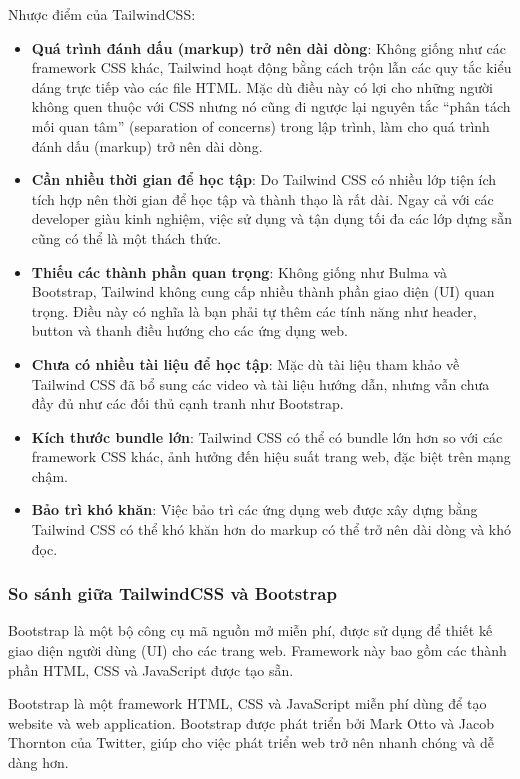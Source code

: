 Nhược điểm của TailwindCSS:
\begin{itemize}
    \item \textbf{Quá trình đánh dấu (markup) trở nên dài dòng}: Không giống như các framework CSS khác, Tailwind hoạt động bằng cách trộn lẫn các quy tắc kiểu dáng trực tiếp vào các file HTML. Mặc dù điều này có lợi cho những người không quen thuộc với CSS nhưng nó cũng đi ngược lại nguyên tắc “phân tách mối quan tâm” (separation of concerns) trong lập trình, làm cho quá trình đánh dấu (markup) trở nên dài dòng. 
    \item \textbf{Cần nhiều thời gian để học tập}: Do Tailwind CSS có nhiều lớp tiện ích tích hợp nên thời gian để học tập và thành thạo là rất dài. Ngay cả với các developer giàu kinh nghiệm, việc sử dụng và tận dụng tối đa các lớp dựng sẵn cũng có thể là một thách thức. 
    \item \textbf{Thiếu các thành phần quan trọng}: Không giống như Bulma và Bootstrap, Tailwind không cung cấp nhiều thành phần giao diện (UI) quan trọng. Điều này có nghĩa là bạn phải tự thêm các tính năng như header, button và thanh điều hướng cho các ứng dụng web. 
    \item \textbf{Chưa có nhiều tài liệu để học tập}: Mặc dù tài liệu tham khảo về Tailwind CSS đã bổ sung các video và tài liệu hướng dẫn, nhưng vẫn chưa đầy đủ như các đối thủ cạnh tranh như Bootstrap. 
    \item \textbf{Kích thước bundle lớn}: Tailwind CSS có thể có bundle lớn hơn so với các framework CSS khác, ảnh hưởng đến hiệu suất trang web, đặc biệt trên mạng chậm. 
    \item \textbf{Bảo trì khó khăn}: Việc bảo trì các ứng dụng web được xây dựng bằng Tailwind CSS có thể khó khăn hơn do markup có thể trở nên dài dòng và khó đọc. \\
\end{itemize}

\subsubsection{So sánh giữa TailwindCSS và Bootstrap}
Bootstrap là một bộ công cụ mã nguồn mở miễn phí, được sử dụng để thiết kế giao diện người dùng (UI) cho các trang web. Framework này bao gồm các thành phần HTML, CSS và JavaScript được tạo sẵn. 

Bootstrap là một framework HTML, CSS và JavaScript miễn phí dùng để tạo website và web application. Bootstrap được phát triển bởi Mark Otto và Jacob Thornton của Twitter, giúp cho việc phát triển web trở nên nhanh chóng và dễ dàng hơn.


